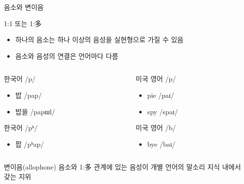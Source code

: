 \documentclass[11pt, aspectratio=169]{beamer}
\newcommand{\textds}[1]{{\ipafont #1}}
\begin{document}
\begin{frame}[t]{음소와 변이음}
    \begin{block}{1:1 또는 1:多}
        \begin{itemize}
            \item 하나의 음소는 하나 이상의 음성을 실현형으로 가질 수 있음    
            \item 음소와 음성의 연결은 언어마다 다름
        \end{itemize}
    \end{block}
    \begin{columns}
        \begin{column}[T]{0.46\textwidth}
            한국어 \textds{/p/}
                \begin{itemize}
                    \item 밥 \textds{/pap/} \textds{[pap]}
                    \item 밥을 \textds{/papɯl/} \textds{[pabɯl]}
                \end{itemize}
            한국어 \textds{/pʰ/}
            \begin{itemize}
                \item 팝 \textds{/pʰap/} \textds{[pʰap]}
            \end{itemize}
        \end{column}
        \begin{column}[T]{0.47\textwidth}
            미국 영어 \textds{/p/} 
            \begin{itemize}
                \item pie \textds{/paɪ/} \textds{[pʰaɪ]}
                \item spy \textds{/spaɪ/} \textds{[spaɪ]}
            \end{itemize}
            미국 영어 \textds{/b/} 
            \begin{itemize}
                \item bye \textds{/baɪ/} \textds{[baɪ]}
            \end{itemize}
        \end{column}
    \end{columns}
   \begin{block}{변이음(allophone)}
        음소와 1:多 관계에 있는 음성이 개별 언어의 말소리 지식 내에서 갖는 지위
    \end{block}
\end{frame}
\end{document}
